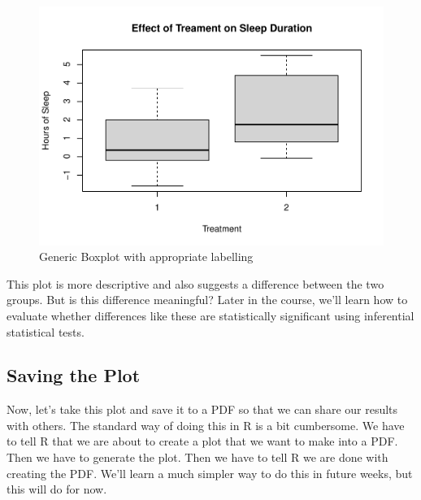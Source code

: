 \documentclass[
]{book}
\newenvironment{Shaded}{\begin{snugshade}}{\end{snugshade}}
\newcommand{\AttributeTok}[1]{\textcolor[rgb]{0.13,0.29,0.53}{#1}}
\newcommand{\CommentTok}[1]{\textcolor[rgb]{0.56,0.35,0.01}{\textit{#1}}}
\newcommand{\FunctionTok}[1]{\textcolor[rgb]{0.13,0.29,0.53}{\textbf{#1}}}
\newcommand{\NormalTok}[1]{#1}
\newcommand{\SpecialCharTok}[1]{\textcolor[rgb]{0.81,0.36,0.00}{\textbf{#1}}}
\newcommand{\StringTok}[1]{\textcolor[rgb]{0.31,0.60,0.02}{#1}}
\begin{document}
\begin{figure}
\centering
\includegraphics{rintro_demo_files/figure-latex/unnamed-chunk-25-1.pdf}
\caption{\label{fig:unnamed-chunk-25}Generic Boxplot with appropriate labelling}
\end{figure}

This plot is more descriptive and also suggests a difference between the two groups. But is this difference meaningful? Later in the course, we'll learn how to evaluate whether differences like these are statistically significant using inferential statistical tests.

\subsection{Saving the Plot}\label{saving-the-plot}

Now, let's take this plot and save it to a PDF so that we can share our results with others. The standard way of doing this in R is a bit cumbersome. We have to tell R that we are about to create a plot that we want to make into a PDF. Then we have to generate the plot. Then we have to tell R we are done with creating the PDF. We'll learn a much simpler way to do this in future weeks, but this will do for now.

\begin{Shaded}
\end{Shaded}
\end{document}
